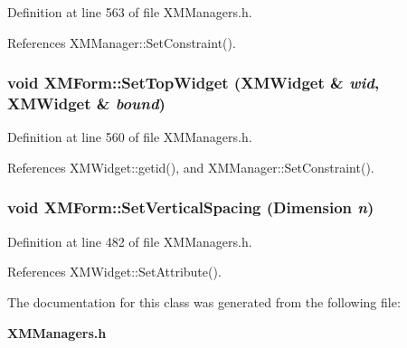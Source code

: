Definition at line 563 of file XMManagers.h.

References XMManager::Set\-Constraint().
\subsubsection{\setlength{\rightskip}{0pt plus 5cm}void XMForm::Set\-Top\-Widget ({\bf XMWidget} \& {\em wid}, {\bf XMWidget} \& {\em bound})\hspace{0.3cm}{\tt  [inline]}}\label{classXMForm_a31}




Definition at line 560 of file XMManagers.h.

References XMWidget::getid(), and XMManager::Set\-Constraint().
\subsubsection{\setlength{\rightskip}{0pt plus 5cm}void XMForm::Set\-Vertical\-Spacing (Dimension {\em n})\hspace{0.3cm}{\tt  [inline]}}\label{classXMForm_a8}




Definition at line 482 of file XMManagers.h.

References XMWidget::Set\-Attribute().

The documentation for this class was generated from the following file:\begin{CompactItemize}
\item 
{\bf XMManagers.h}\end{CompactItemize}
